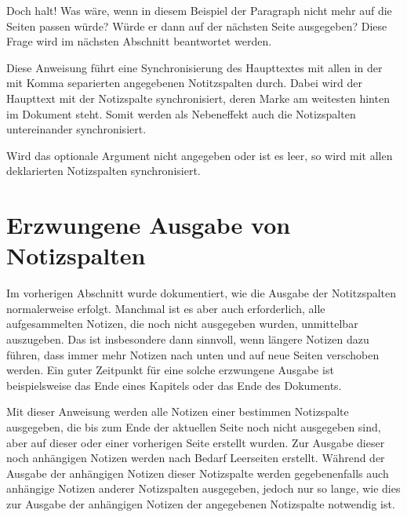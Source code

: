 Doch halt! Was wäre, wenn in diesem Beispiel der Paragraph nicht mehr auf die
Seiten passen würde? Würde er dann auf der nächsten Seite ausgegeben? Diese
Frage wird im nächsten Abschnitt beantwortet werden.
\EndIndexGroup


\begin{Declaration}
\end{Declaration}
Diese Anweisung führt eine Synchronisierung des Haupttextes mit allen in der
mit Komma separierten  angegebenen Notitzspalten
durch. Dabei wird der Haupttext mit der Notizspalte synchronisiert, deren
Marke am weitesten hinten im Dokument steht. Somit werden als Nebeneffekt auch
die Notizspalten untereinander synchronisiert.

Wird das optionale Argument nicht angegeben oder ist es leer, so wird mit
allen deklarierten Notizspalten synchronisiert.%
\EndIndexGroup


\section{Erzwungene Ausgabe von Notizspalten}

\iftrue %
Im vorherigen Abschnitt wurde dokumentiert, wie die Ausgabe der Notitzspalten
normalerweise erfolgt. Manchmal ist es aber %
\else%
Neben der normalen Ausgabe der Notizspalten, wie sie im vorherigen Abschnitt
beschrieben ist, ist es manchmal %
\fi %
auch erforderlich, alle aufgesammelten Notizen, die noch nicht ausgegeben
wurden, unmittelbar auszugeben. Das ist insbesondere dann sinnvoll, wenn
längere Notizen dazu führen, dass immer mehr Notizen nach unten und auf neue
Seiten verschoben werden. Ein guter Zeitpunkt für eine solche erzwungene
Ausgabe ist beispielsweise das Ende eines Kapitels
oder das Ende des Dokuments.

\begin{Declaration}
\end{Declaration}
Mit dieser Anweisung werden alle Notizen einer bestimmen Notizspalte
ausgegeben, die
bis zum Ende der aktuellen Seite noch nicht ausgegeben sind, aber auf dieser
oder einer vorherigen Seite erstellt wurden. Zur Ausgabe dieser noch
anhängigen Notizen werden nach Bedarf Leerseiten erstellt. Während der Ausgabe
der anhängigen Notizen dieser Notizspalte werden gegebenenfalls auch anhängige
Notizen anderer Notizspalten ausgegeben, jedoch nur so lange, wie dies zur
Ausgabe der anhängigen Notizen der angegebenen Notizspalte notwendig ist.


